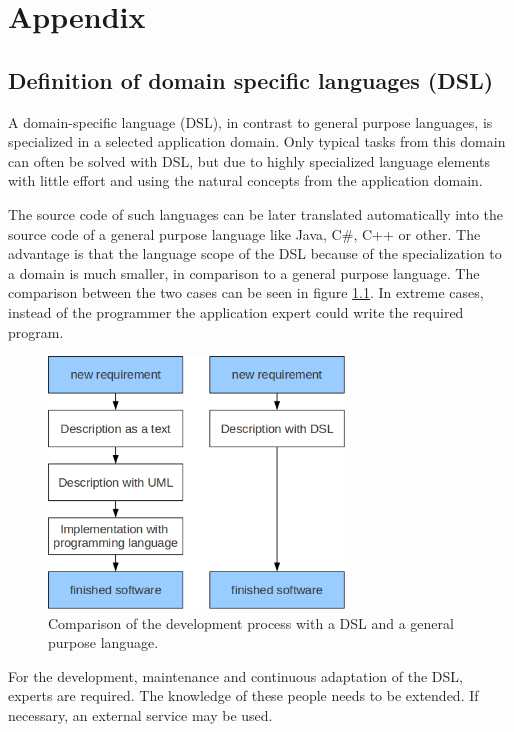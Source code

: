\appendix
\chapter{Appendix}
\section{Definition of domain specific languages (DSL)}
\par
A domain-specific language (DSL), in contrast to general purpose languages, is specialized in a selected application domain. Only typical tasks from this domain can often be solved with DSL, but due to highly specialized language elements with little effort and using the natural concepts from the application domain.
\par
The source code of such languages can be later translated automatically into the source code of a general purpose language like Java, C\#, C++ or other. The advantage is that the language scope of the DSL because of the specialization to a domain is much smaller, in comparison to a general purpose language. The comparison between the two cases can be seen in figure \ref{fig:dsl}. In extreme cases, instead of the programmer the application expert could write the required program. \autocite{appendix:dsl}
\begin{figure}[h]
	\centering
	\includegraphics[width=0.7\textwidth]{pics/appendix/dsl.png}
	\caption{Comparison of the development process with a DSL and a general purpose language.  \label{fig:dsl}}	
\end{figure}
\par
For the development, maintenance and continuous adaptation of the DSL, experts are required. The knowledge of these people needs to be extended. If necessary, an external service may be used. \autocite{appendix:dsl} 


